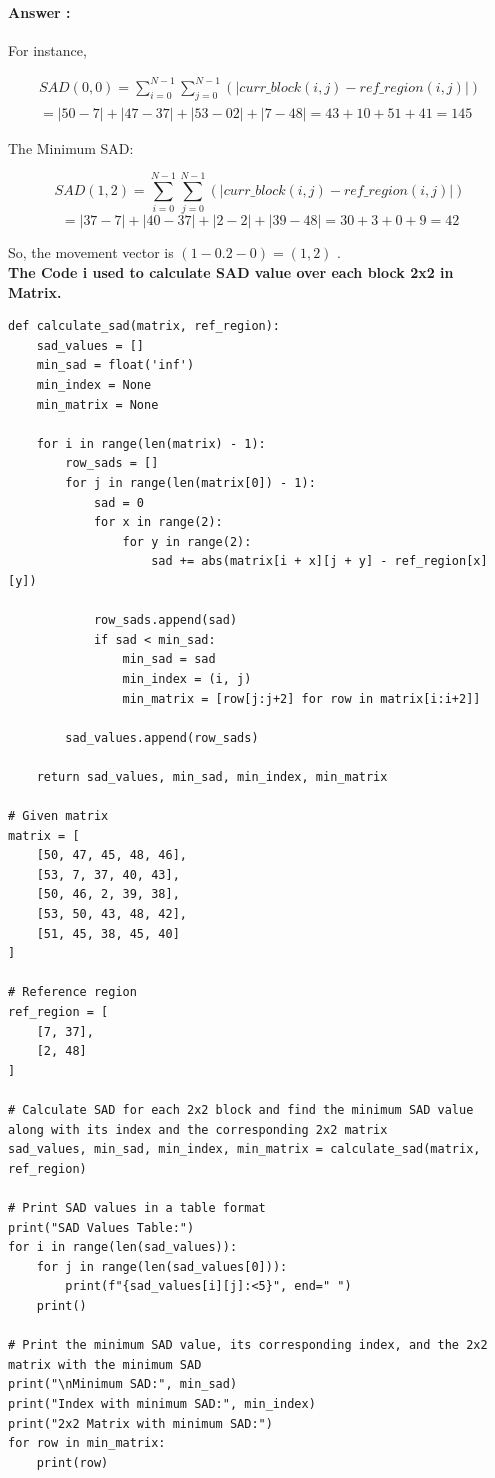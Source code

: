 \documentclass[letterpaper, 12pt]{article}
\begin{document}
\paragraph{Answer :}
For instance, 

\begin{align*}
    SAD(0,0) = \sum_{i=0}^{N-1}\sum_{j=0}^{N-1}(|curr\_block(i,j) - ref\_region(i,j)|) \\
    = |50 - 7| +|47-37| + |53-02|+|7-48| = 43 + 10 + 51 + 41 = 145
\end{align*}

The Minimum SAD: 

\[SAD(1,2) = \sum_{i=0}^{N-1}\sum_{j=0}^{N-1}(|curr\_block(i,j) - ref\_region(i,j)|)\]
\[= |37 - 7| +|40-37| + |2-2|+|39-48| = 30 + 3 + 0 + 9 = 42\]

So, the movement vector is $(1-0.2-0) = (1,2)$ . \\
\newpage
\textbf{The Code i used to calculate SAD value over each block 2x2 in Matrix.}
\begin{lstlisting}
def calculate_sad(matrix, ref_region):
    sad_values = []
    min_sad = float('inf')
    min_index = None
    min_matrix = None

    for i in range(len(matrix) - 1):
        row_sads = []
        for j in range(len(matrix[0]) - 1):
            sad = 0
            for x in range(2):
                for y in range(2):
                    sad += abs(matrix[i + x][j + y] - ref_region[x][y])

            row_sads.append(sad)
            if sad < min_sad:
                min_sad = sad
                min_index = (i, j)
                min_matrix = [row[j:j+2] for row in matrix[i:i+2]]

        sad_values.append(row_sads)

    return sad_values, min_sad, min_index, min_matrix

# Given matrix
matrix = [
    [50, 47, 45, 48, 46],
    [53, 7, 37, 40, 43],
    [50, 46, 2, 39, 38],
    [53, 50, 43, 48, 42],
    [51, 45, 38, 45, 40]
]

# Reference region
ref_region = [
    [7, 37],
    [2, 48]
]

# Calculate SAD for each 2x2 block and find the minimum SAD value along with its index and the corresponding 2x2 matrix
sad_values, min_sad, min_index, min_matrix = calculate_sad(matrix, ref_region)

# Print SAD values in a table format
print("SAD Values Table:")
for i in range(len(sad_values)):
    for j in range(len(sad_values[0])):
        print(f"{sad_values[i][j]:<5}", end=" ")
    print()

# Print the minimum SAD value, its corresponding index, and the 2x2 matrix with the minimum SAD
print("\nMinimum SAD:", min_sad)
print("Index with minimum SAD:", min_index)
print("2x2 Matrix with minimum SAD:")
for row in min_matrix:
    print(row)


\end{lstlisting}
\end{document}

